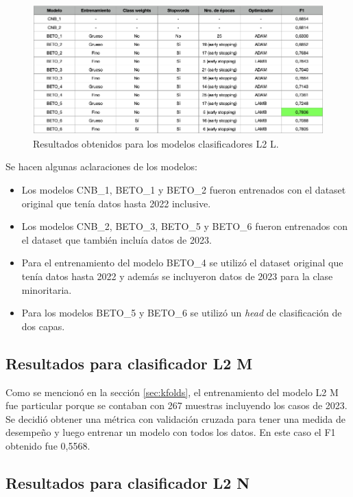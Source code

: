 \begin{figure}[htbp]
	\centering
	\includegraphics[width=1\textwidth]{./Figures/cap4-resultados-l2l.png}
	\caption{Resultados obtenidos para los modelos clasificadores L2 L.}
	\label{fig:res-l2l}
\end{figure}

Se hacen algunas aclaraciones de los modelos:
\begin{itemize}
	\item Los modelos CNB\_1, BETO\_1 y BETO\_2 fueron entrenados con el dataset original que tenía datos hasta 2022 inclusive.
	\item Los modelos CNB\_2, BETO\_3, BETO\_5 y BETO\_6 fueron entrenados con el dataset que también incluía datos de 2023.
	\item Para el entrenamiento del modelo BETO\_4 se utilizó el dataset original que tenía datos hasta 2022 y además se incluyeron datos de 2023 para la clase minoritaria.
	\item Para los modelos BETO\_5 y BETO\_6 se utilizó un \textit{head} de clasificación de dos capas.
\end{itemize}

\subsection{Resultados para clasificador L2 M}

Como se mencionó en la sección \ref{sec:kfolds}, el entrenamiento del modelo L2 M fue particular porque se contaban con 267 muestras incluyendo los casos de 2023. Se decidió obtener una métrica con validación cruzada para tener una medida de desempeño y luego entrenar un modelo con todos los datos. En este caso el F1 obtenido fue 0,5568.

\subsection{Resultados para clasificador L2 N}

